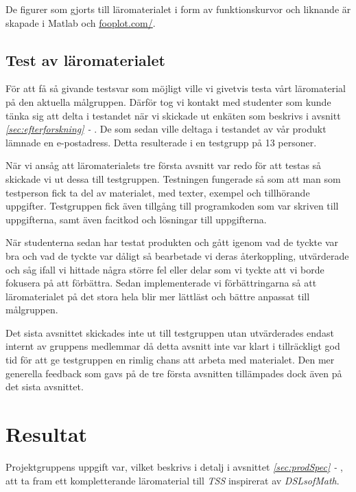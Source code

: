 \documentclass[12pt,a4paper,twoside,openright]{article}
\begin{document}
De figurer som gjorts till läromaterialet i form av funktionskurvor
och liknande är skapade i Matlab och \url{fooplot.com/}.

\subsection{Test av läromaterialet}
\label{sec:test}

För att få så givande testsvar som möjligt ville vi givetvis testa
vårt läromaterial på den aktuella målgruppen. Därför tog vi kontakt
med studenter som kunde tänka sig att delta i testandet när vi
skickade ut enkäten som beskrivs i avsnitt \textit{\ref{sec:efterforskning} -
}. De som
sedan ville deltaga i testandet av vår produkt lämnade en
e-postadress. Detta resulterade i en testgrupp på 13 personer.

När vi ansåg att läromaterialets tre första avsnitt var redo för att
testas så skickade vi ut dessa till testgruppen. Testningen fungerade så
som att man som testperson fick ta del av materialet, med texter,
exempel och tillhörande uppgifter. Testgruppen fick även tillgång till
programkoden som var skriven till uppgifterna, samt även facitkod och
lösningar till uppgifterna.

När studenterna sedan har testat produkten och gått igenom vad de
tyckte var bra och vad de tyckte var dåligt så bearbetade vi deras
återkoppling, utvärderade och såg ifall vi hittade några större fel
eller delar som vi tyckte att vi borde fokusera på att
förbättra. Sedan implementerade vi förbättringarna så att
läromaterialet på det stora hela blir mer lättläst och bättre anpassat
till målgruppen.

Det sista avsnittet skickades inte ut till testgruppen utan
utvärderades endast internt av gruppens medlemmar då detta avsnitt
inte var klart i tillräckligt god tid för att ge testgruppen en rimlig
chans att arbeta med materialet. Den mer generella feedback som gavs
på de tre första avsnitten tillämpades dock även på det sista
avsnittet.

\section{Resultat}


%
Projektgruppens uppgift var, vilket beskrivs i detalj i avsnittet
\textit{\ref{sec:prodSpec} - }, att ta fram ett kompletterande
läromaterial till \textit{TSS} inspirerat av \textit{DSLsofMath}.
\end{document}
